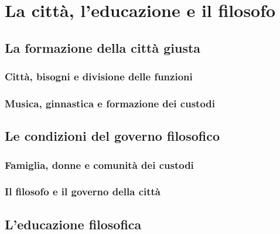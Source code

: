 \chapter{La città, l'educazione e il filosofo}
\label{cap:platone:citta}

\section{La formazione della città giusta}

\subsection{Città, bisogni e divisione delle funzioni}

\subsection{Musica, ginnastica e formazione dei custodi}

\section{Le condizioni del governo filosofico}

\subsection{Famiglia, donne e comunità dei custodi}

\subsection{Il filosofo e il governo della città}

\section{L'educazione filosofica}

